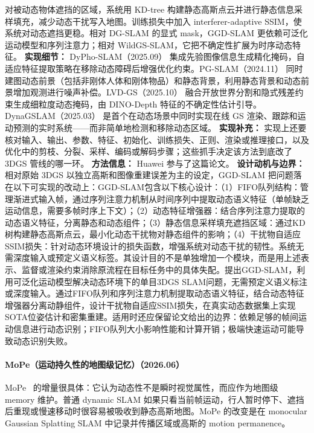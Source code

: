 对被动态物体遮挡的区域，系统用 KD-tree 构建静态高斯点云并进行静态信息采样填充，减少动态干扰写入地图。训练损失中加入 interferer-adaptive SSIM，使系统对动态遮挡更稳。相对 DG-SLAM 的显式 mask，GGD-SLAM 更依赖可泛化运动模型和序列注意力；相对 WildGS-SLAM，它把不确定性扩展为时序动态特征。
\textbf{实现细节：} DyPho-SLAM（2025.09） 集成先验图像信息生成精化掩码，自适应特征提取策略在移除动态障碍后增强优化约束。PG-SLAM（2024.11） 同时建图动态前景（包括非刚体人体和刚体物品）和静态背景，利用静态背景和动态前景增加观测进行噪声补偿。LVD-GS（2025.10） 融合开放世界分割和隐式残差约束生成细粒度动态掩码，由 DINO-Depth 特征的不确定性估计引导。DynaGSLAM（2025.03） 是首个在动态场景中同时实现在线 GS 渲染、跟踪和运动预测的实时系统——而非简单地检测和移除动态区域。
\textbf{实现补充：} 实现上还要核对输入、输出、参数、特征、初始化、训练损失、正则、渲染或推理接口，以及优化中的剪枝、分裂、采样、编码或解码步骤；这些抓手决定该方法到底改了 3DGS 管线的哪一环。
\textbf{方法信息：} Huawei 参与了这篇论文。
\textbf{设计动机与边界：} 相对原始 3DGS 以独立高斯和图像重建误差为主的设定，GGD-SLAM 把问题落在以下可实现的改动上：GGD-SLAM包含以下核心设计：（1）FIFO队列结构：管理渐进式输入帧，通过序列注意力机制从时间序列中提取动态语义特征（单帧缺乏运动信息，需要多帧时序上下文）；（2）动态特征增强器：结合序列注意力提取的动态语义特征，分离静态和动态组件；（3）静态信息采样填充遮挡区域：通过KD树构建静态高斯点云，最小化动态干扰物对静态组件的影响；（4）干扰物自适应SSIM损失：针对动态环境设计的损失函数，增强系统对动态干扰的韧性。系统无需深度输入或预定义语义标签。其设计目的不是单独增加一个模块，而是用上述表示、监督或渲染约束消除原流程在目标任务中的具体失配。提出GGD-SLAM，利用可泛化运动模型解决动态环境下的单目3DGS SLAM问题，无需预定义语义标注或深度输入。通过FIFO队列和序列注意力机制提取动态语义特征，结合动态特征增强器分离动静组件，设计干扰物自适应SSIM损失，在真实动态数据集上实现SOTA位姿估计和密集重建。适用时还应保留论文给出的边界：依赖足够的帧间运动信息进行动态识别；FIFO队列大小影响性能和计算开销；极端快速运动可能导致动态识别失败。
\paragraph{MoPe（运动持久性的地图级记忆）（2026.06）}
MoPe~\cite{2606_29237} 的增量很具体：它认为动态性不是瞬时视觉属性，而应作为地图级 memory 维护。普通 dynamic SLAM 如果只看当前帧运动，行人暂时停下、遮挡后重现或慢速移动时很容易被吸收到静态高斯地图。MoPe 的改变是在 monocular Gaussian Splatting SLAM 中记录并传播区域或高斯的 motion permanence。

